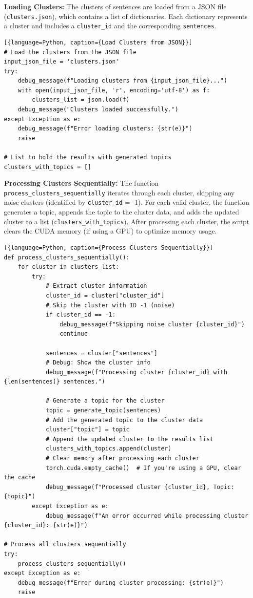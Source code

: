 \noindent\textbf{Loading Clusters:} The clusters of sentences are loaded from a JSON file (\texttt{clusters.json}), 
which contains a list of dictionaries. Each dictionary represents a cluster and includes a \texttt{cluster\_id} 
and the corresponding \texttt{sentences}.
\begin{lstlisting}[{language=Python, caption={Load Clusters from JSON}}]
# Load the clusters from the JSON file
input_json_file = 'clusters.json'
try:
    debug_message(f"Loading clusters from {input_json_file}...")
    with open(input_json_file, 'r', encoding='utf-8') as f:
        clusters_list = json.load(f)
    debug_message("Clusters loaded successfully.")
except Exception as e:
    debug_message(f"Error loading clusters: {str(e)}")
    raise

# List to hold the results with generated topics
clusters_with_topics = []
\end{lstlisting}

\noindent\textbf{Processing Clusters Sequentially:} The function \texttt{process\_clusters\_sequentially} iterates through
 each cluster, skipping any noise clusters (identified by \texttt{cluster\_id} = -1). For each valid cluster, 
the function generates a topic, appends the topic to the cluster data, and adds the updated cluster to a list 
(\texttt{clusters\_with\_topics}). After processing each cluster, the script clears the CUDA memory (if using a GPU)
 to optimize memory usage.
\begin{lstlisting}[{language=Python, caption={Process Clusters Sequentially}}]
def process_clusters_sequentially():
    for cluster in clusters_list:
        try:
            # Extract cluster information
            cluster_id = cluster["cluster_id"]
            # Skip the cluster with ID -1 (noise)
            if cluster_id == -1:
                debug_message(f"Skipping noise cluster {cluster_id}")
                continue
            
            sentences = cluster["sentences"]
            # Debug: Show the cluster info
            debug_message(f"Processing cluster {cluster_id} with {len(sentences)} sentences.")
            
            # Generate a topic for the cluster
            topic = generate_topic(sentences)
            # Add the generated topic to the cluster data
            cluster["topic"] = topic
            # Append the updated cluster to the results list
            clusters_with_topics.append(cluster)
            # Clear memory after processing each cluster
            torch.cuda.empty_cache()  # If you're using a GPU, clear the cache
            debug_message(f"Processed cluster {cluster_id}, Topic: {topic}")        
        except Exception as e:
            debug_message(f"An error occurred while processing cluster {cluster_id}: {str(e)}")

# Process all clusters sequentially
try:
    process_clusters_sequentially()
except Exception as e:
    debug_message(f"Error during cluster processing: {str(e)}")
    raise
\end{lstlisting}

